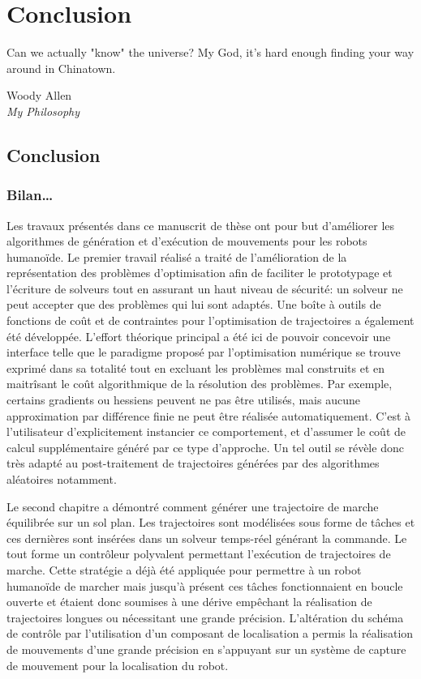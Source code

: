 \chapter{Conclusion}
\label{chap:conclusion}

\epigraph{\foreignlanguage{USenglish}{Can we actually "know" the
    universe? My God, it's hard enough finding your way around in
    Chinatown.}}{Woody Allen\\\emph{My Philosophy}}
\clearpage

\section{Conclusion}
\subsection{Bilan\ldots}

Les travaux présentés dans ce manuscrit de thèse ont pour but
d'améliorer les algorithmes de génération et d'exécution de mouvements
pour les robots humanoïde. Le premier travail réalisé a traité de
l'amélioration de la représentation des problèmes d'optimisation afin
de faciliter le prototypage et l'écriture de solveurs tout en assurant
un haut niveau de sécurité: un solveur ne peut accepter que des
problèmes qui lui sont adaptés. Une boîte à outils de fonctions de
coût et de contraintes pour l'optimisation de trajectoires a également
été développée. L'effort théorique principal a été ici de pouvoir
concevoir une interface telle que le paradigme proposé par
l'optimisation numérique se trouve exprimé dans sa totalité tout en
excluant les problèmes mal construits et en maitrîsant le coût
algorithmique de la résolution des problèmes. Par exemple, certains
gradients ou hessiens peuvent ne pas être utilisés, mais aucune
approximation par différence finie ne peut être réalisée
automatiquement. C'est à l'utilisateur d'explicitement instancier ce
comportement, et d'assumer le coût de calcul supplémentaire généré par
ce type d'approche. Un tel outil se révèle donc très adapté au
post-traitement de trajectoires générées par des algorithmes
aléatoires notamment.


Le second chapitre a démontré comment générer une trajectoire de
marche équilibrée sur un sol plan. Les trajectoires sont modélisées
sous forme de tâches et ces dernières sont insérées dans un solveur
temps-réel générant la commande. Le tout forme un contrôleur
polyvalent permettant l'exécution de trajectoires de marche. Cette
stratégie a déjà été appliquée pour permettre à un robot humanoïde de
marcher mais jusqu'à présent ces tâches fonctionnaient en boucle
ouverte et étaient donc soumises à une dérive empêchant la réalisation
de trajectoires longues ou nécessitant une grande
précision. L'altération du schéma de contrôle par l'utilisation d'un
composant de localisation a permis la réalisation de mouvements d'une
grande précision en s'appuyant sur un système de capture de mouvement
pour la localisation du robot.


